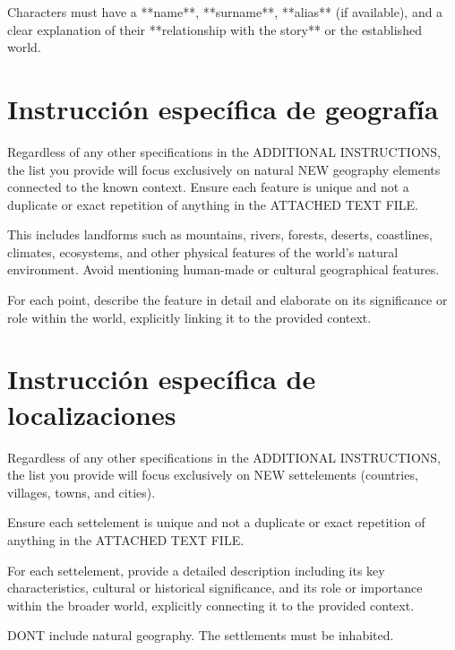 Characters must have a **name**, **surname**, **alias** (if available),
and a clear explanation of their **relationship with the story** or the established world.

\section{Instrucción específica de geografía}
Regardless of any other specifications in the ADDITIONAL INSTRUCTIONS,
the list you provide will focus exclusively on natural NEW geography elements connected to the known context.
Ensure each feature is unique and not a duplicate or exact repetition of anything in the ATTACHED TEXT FILE.

This includes landforms such as mountains, rivers, forests, deserts, coastlines, climates,
ecosystems, and other physical features of the world's natural environment.
Avoid mentioning human-made or cultural geographical features.

For each point, describe the feature in detail and elaborate on its significance or role within the world, explicitly linking it to the provided context.

\section{Instrucción específica de localizaciones}
Regardless of any other specifications in the ADDITIONAL INSTRUCTIONS,
the list you provide will focus exclusively on NEW settelements
(countries, villages, towns, and cities).

Ensure each settelement is unique and not a duplicate or exact repetition
of anything in the ATTACHED TEXT FILE.

For each settelement, provide a detailed description including its key characteristics,
cultural or historical significance,
and its role or importance within the broader world,
explicitly connecting it to the provided context.

DONT include natural geography. The settlements must be inhabited.